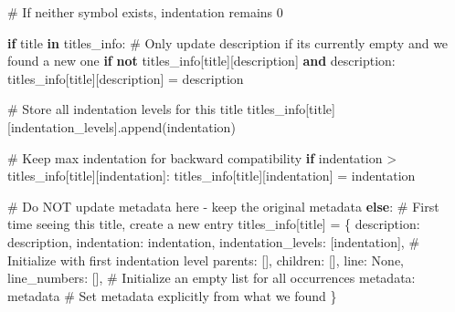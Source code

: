 \documentclass[
  11pt,
  letterpaper,
]{book}
\newenvironment{Shaded}{\begin{snugshade}}{\end{snugshade}}
\newcommand{\CommentTok}[1]{\textcolor[rgb]{0.37,0.37,0.37}{#1}}
\newcommand{\ControlFlowTok}[1]{\textcolor[rgb]{0.00,0.23,0.31}{\textbf{#1}}}
\newcommand{\KeywordTok}[1]{\textcolor[rgb]{0.00,0.23,0.31}{\textbf{#1}}}
\newcommand{\NormalTok}[1]{\textcolor[rgb]{0.00,0.23,0.31}{#1}}
\newcommand{\OperatorTok}[1]{\textcolor[rgb]{0.37,0.37,0.37}{#1}}
\newcommand{\StringTok}[1]{\textcolor[rgb]{0.13,0.47,0.30}{#1}}
\newcommand{\VariableTok}[1]{\textcolor[rgb]{0.07,0.07,0.07}{#1}}
\begin{document}
\begin{Shaded}
\begin{Highlighting}[]
        \CommentTok{\# If neither symbol exists, indentation remains 0}

        \ControlFlowTok{if}\NormalTok{ title }\KeywordTok{in}\NormalTok{ titles\_info:}
            \CommentTok{\# Only update description if it\textquotesingle{}s currently empty and we found a new one}
            \ControlFlowTok{if} \KeywordTok{not}\NormalTok{ titles\_info[title][}\StringTok{\textquotesingle{}description\textquotesingle{}}\NormalTok{] }\KeywordTok{and}\NormalTok{ description:}
\NormalTok{                titles\_info[title][}\StringTok{\textquotesingle{}description\textquotesingle{}}\NormalTok{] }\OperatorTok{=}\NormalTok{ description}

            \CommentTok{\# Store all indentation levels for this title}
\NormalTok{            titles\_info[title][}\StringTok{\textquotesingle{}indentation\_levels\textquotesingle{}}\NormalTok{].append(indentation)}

            \CommentTok{\# Keep max indentation for backward compatibility}
            \ControlFlowTok{if}\NormalTok{ indentation }\OperatorTok{\textgreater{}}\NormalTok{ titles\_info[title][}\StringTok{\textquotesingle{}indentation\textquotesingle{}}\NormalTok{]:}
\NormalTok{                titles\_info[title][}\StringTok{\textquotesingle{}indentation\textquotesingle{}}\NormalTok{] }\OperatorTok{=}\NormalTok{ indentation}

            \CommentTok{\# Do NOT update metadata here {-} keep the original metadata}
        \ControlFlowTok{else}\NormalTok{:}
            \CommentTok{\# First time seeing this title, create a new entry}
\NormalTok{            titles\_info[title] }\OperatorTok{=}\NormalTok{ \{}
                \StringTok{\textquotesingle{}description\textquotesingle{}}\NormalTok{: description,}
                \StringTok{\textquotesingle{}indentation\textquotesingle{}}\NormalTok{: indentation,}
                \StringTok{\textquotesingle{}indentation\_levels\textquotesingle{}}\NormalTok{: [indentation],  }\CommentTok{\# Initialize with first indentation level}
                \StringTok{\textquotesingle{}parents\textquotesingle{}}\NormalTok{: [],}
                \StringTok{\textquotesingle{}children\textquotesingle{}}\NormalTok{: [],}
                \StringTok{\textquotesingle{}line\textquotesingle{}}\NormalTok{: }\VariableTok{None}\NormalTok{,}
                \StringTok{\textquotesingle{}line\_numbers\textquotesingle{}}\NormalTok{: [],  }\CommentTok{\# Initialize an empty list for all occurrences}
                \StringTok{\textquotesingle{}metadata\textquotesingle{}}\NormalTok{: metadata  }\CommentTok{\# Set metadata explicitly from what we found}
\NormalTok{            \}}


\end{Highlighting}
\end{Shaded}
\end{document}
